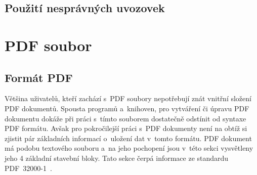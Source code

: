 
\section{Použití nesprávných uvozovek}
\dummyText
{}







\chapter{PDF soubor}

\dummyText



\section{Formát PDF} \label{format_PDF}
Většina uživatelů, kteří zachází s~PDF soubory nepotřebují znát vnitřní složení
PDF dokumentů. Spousta programů a~knihoven, pro vytváření či úpravu PDF dokumentu
dokáže při práci s~tímto souborem dostatečně odstínit od syntaxe PDF formátu.
Avšak pro pokročilejší práci s~PDF dokumenty není na obtíž si zjistit pár
základních informací o~uložení dat v~tomto formátu.
PDF dokument má podobu textového souboru a~na jeho pochopení jsou v~této sekci
vysvětleny jeho 4 základní stavební bloky. Tato sekce čerpá informace ze
standardu PDF~32000-1~\cite{PDF32000-1:2008}.


